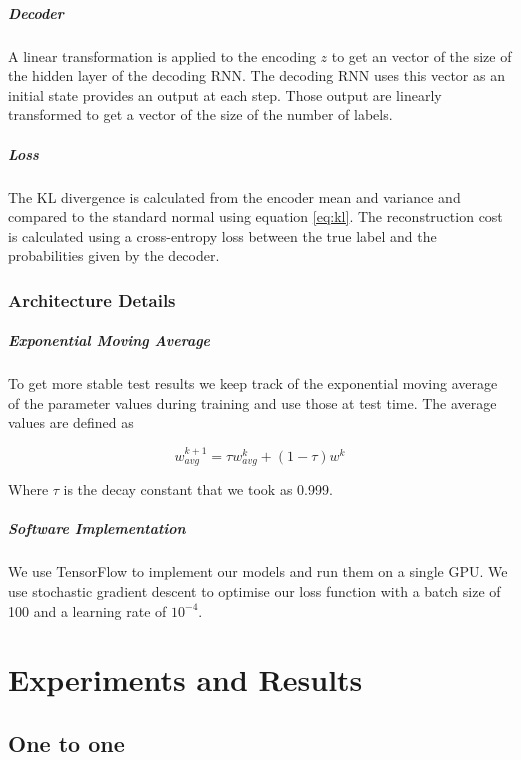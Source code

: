 \documentclass[11pt,oneside,openright]{report}
\begin{document}
\paragraph{Decoder}
A linear transformation is applied to the encoding $z$  to get an vector of the size of the hidden layer of the decoding RNN. The decoding RNN uses this vector as an initial state provides an output at each step. Those output are linearly transformed to get a vector of the size of the number of labels. 

\paragraph{Loss}
The KL divergence is calculated from the encoder mean and variance and compared to the standard normal using equation \ref{eq:kl}. The reconstruction cost is calculated using a cross-entropy loss between the true label and the probabilities given by the decoder.

\subsection{Architecture Details }
\paragraph{Exponential Moving Average}
To get more stable test results we keep track of the exponential moving average of the parameter values during training and use those at test time. The average values are defined as

$$w_{avg}^{k+1} = \tau w_{avg}^k  + (1 - \tau) w^k$$

Where $\tau$ is the decay constant that we took as 0.999.

\paragraph{Software Implementation}
We use TensorFlow to implement our models and run them on a single GPU. We use stochastic gradient descent to optimise our loss function with a batch size of 100 and a learning rate of $10^{-4}$.

\chapter{Experiments and Results}
\section{One to one}
\end{document}
